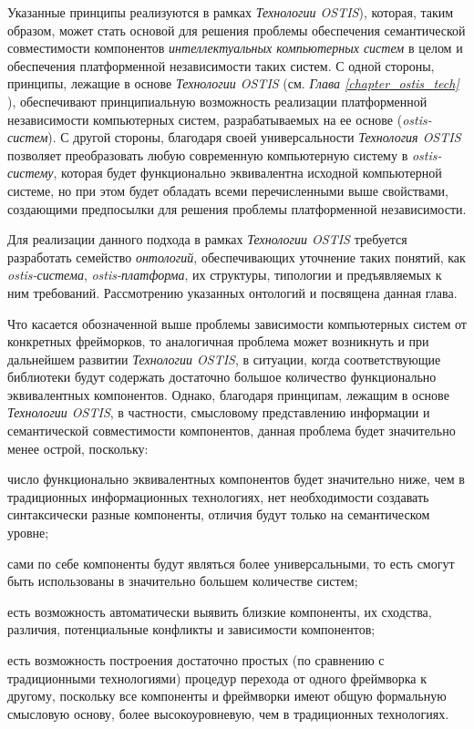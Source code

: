 Указанные принципы реализуются в рамках \textit{Технологии OSTIS}), которая, таким образом, может стать основой для решения проблемы обеспечения семантической совместимости компонентов \textit{интеллектуальных компьютерных систем} в целом и обеспечения платформенной независимости таких систем.
С одной стороны, принципы, лежащие в основе \textit{Технологии OSTIS} (см. \textit{Глава \ref{chapter_ostis_tech} }), обеспечивают принципиальную возможность реализации платформенной независимости компьютерных систем, разрабатываемых на ее основе (\textit{ostis-систем}). С другой стороны, благодаря своей универсальности \textit{Технология OSTIS} позволяет преобразовать любую современную компьютерную систему в \textit{ostis-систему}, которая будет функционально эквивалентна исходной компьютерной системе, но при этом будет обладать всеми перечисленными выше свойствами, создающими предпосылки для решения проблемы платформенной независимости.

Для реализации данного подхода в рамках \textit{Технологии OSTIS} требуется разработать семейство \textit{онтологий}, обеспечивающих уточнение таких понятий, как \textit{ostis-система}, \textit{ostis-платформа}, их структуры, типологии и предъявляемых к ним требований. Рассмотрению указанных онтологий и посвящена данная глава.

Что касается обозначенной выше проблемы зависимости компьютерных систем от конкретных фрейморков, то аналогичная проблема может возникнуть и при дальнейшем развитии \textit{Технологии OSTIS}, в ситуации, когда соответствующие библиотеки будут содержать достаточно большое количество функционально эквивалентных компонентов. Однако, благодаря принципам, лежащим в основе \textit{Технологии OSTIS}, в частности, смысловому представлению информации и семантической совместимости компонентов, данная проблема будет значительно менее острой, поскольку:
\begin{textitemize}
	\item число функционально эквивалентных компонентов будет значительно ниже, чем в традиционных информационных технологиях, нет необходимости создавать синтаксически разные компоненты, отличия будут только на семантическом уровне;
	\item сами по себе компоненты будут являться более универсальными, то есть смогут быть использованы в значительно большем количестве систем;
	\item есть возможность автоматически выявить близкие компоненты, их сходства, различия, потенциальные конфликты и зависимости компонентов;
	\item есть возможность построения достаточно простых (по сравнению с традиционными технологиями) процедур перехода от одного фреймворка к другому, поскольку все компоненты и фреймворки имеют общую формальную смысловую основу, более высокоуровневую, чем в традиционных технологиях.
\end{textitemize}

